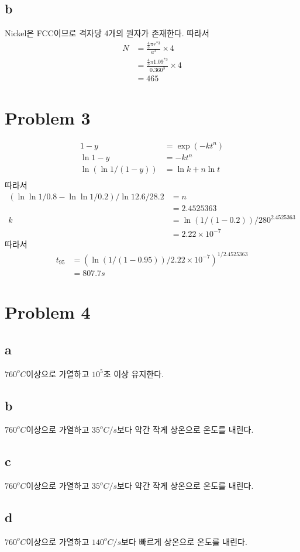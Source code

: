 \documentclass[a4paper]{oblivoir}
\begin{document}
\subsection{b}
Nickel은 FCC이므로 격자당 4개의 원자가 존재한다. 따라서
\begin{align}
	N &= \frac{\frac{4}{3}\pi r^{*3}}{a^{3}}\times4\\
	&= \frac{\frac{4}{3}\pi 1.09^{*3}}{0.360^{3}}\times4\\
	&= 465
\end{align}

\section{Problem 3}
\begin{align}
	1 - y &= \exp(-kt^{n})\\
	\ln{1-y} &= -kt^{n}\\
	\ln\left(\ln{1/(1-y)}\right) &= \ln k + n\ln t\\
\end{align}
따라서
\begin{align}
	( \ln\ln1/0.8 - \ln\ln1/0.2 ) / \ln12.6/28.2&= n\\
	&=2.4525363\\
	k &= \ln(1/(1-0.2))/280^{2.4525363}\\
	&= 2.22\times10^{-7}
\end{align}
따라서
\begin{align}
	t_{95} &= (\ln(1/(1-0.95))/2.22\times10^{-7})^{1/2.4525363}\\
	&= 807.7 s
\end{align}

\section{Problem 4}
\subsection{a}
$760^{o}C$이상으로 가열하고 $10^{5}$초 이상 유지한다.

\subsection{b}
$760^{o}C$이상으로 가열하고 $35^{o}C/s$보다 약간 작게 상온으로 온도를 내린다.

\subsection{c}
$760^{o}C$이상으로 가열하고 $35^{o}C/s$보다 약간 작게 상온으로 온도를 내린다.

\subsection{d}
$760^{o}C$이상으로 가열하고 $140^{o}C/s$보다 빠르게 상온으로 온도를 내린다.

\end{document}
